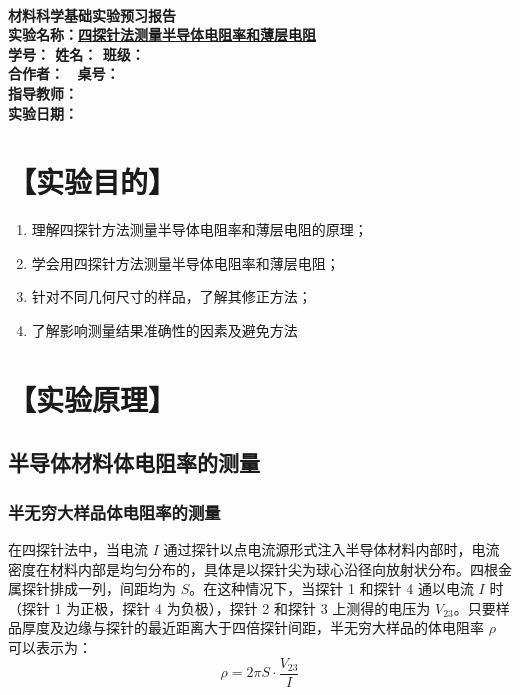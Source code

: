 \documentclass[a4paper,utf8]{article}
\begin{document}
\begin{center}
    {\mbox{}\\[7em]\bfseries\songti%
    材料科学基础实验预习报告}\\[34mm]
    {\bfseries\songti
    实验名称：\uline{\hfill\mbox{四探针法测量半导体电阻率和薄层电阻}\hfill} \\[2.9mm]
    学\quad 号：\uline{}\hfill
    姓\quad 名：\uline{}\hfill
    班\quad 级：\uline{} \\[2.9mm]
    合作者：\uline{\makebox[25mm]{}}\enspace~
    桌\quad 号：\uline{\makebox[25mm]{}}\hfill\mbox{}\\[2.9mm]
    指导教师：\uline{}\hfill\mbox{} \\[2.9mm]
    实验日期：\uline{\makebox[30mm]{}}\hfill\mbox{} \\[58.7mm]
    }
\end{center}
\newpage
\section*{【实验目的】}
    \begin{enumerate}
        \item 理解四探针方法测量半导体电阻率和薄层电阻的原理；
        \item 学会用四探针方法测量半导体电阻率和薄层电阻；
        \item 针对不同几何尺寸的样品，了解其修正方法；
        \item 了解影响测量结果准确性的因素及避免方法
    \end{enumerate}
\section*{【实验原理】}%
    \subsection{半导体材料体电阻率的测量}
        \subsubsection{半无穷大样品体电阻率的测量}
            
            在四探针法中，当电流 $I$ 通过探针以点电流源形式注入半导体材料内部时，电流密度在材料内部是均匀分布的，具体是以探针尖为球心沿径向放射状分布。四根金属探针排成一列，间距均为 $S$。在这种情况下，当探针 1 和探针 4 通以电流 $I$ 时（探针 1 为正极，探针 4 为负极），探针 2 和探针 3 上测得的电压为 $V_{23}$。只要样品厚度及边缘与探针的最近距离大于四倍探针间距，半无穷大样品的体电阻率 $\rho$ 可以表示为：            \begin{equation*}
                \rho = 2\pi S\cdot\frac{V_{23}}{I} \label{eq:0}
            \end{equation*} 
            
\end{document}
